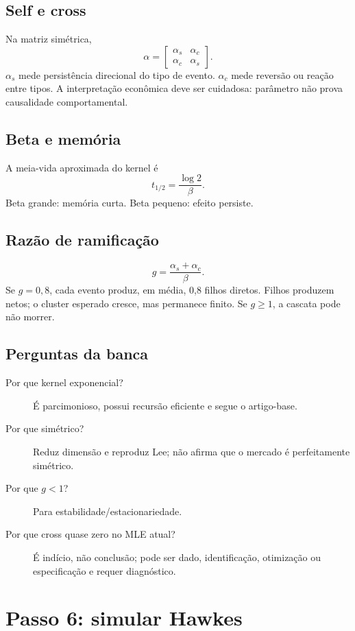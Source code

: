 \documentclass[12pt,a4paper,openany]{report}
\begin{document}
\section{Self e cross}

Na matriz simétrica,
\[
\alpha=
\begin{bmatrix}\alpha_s&\alpha_c\\\alpha_c&\alpha_s\end{bmatrix}.
\]
\(\alpha_s\) mede persistência direcional do tipo de evento. \(\alpha_c\) mede reversão
ou reação entre tipos. A interpretação econômica deve ser cuidadosa: parâmetro não
prova causalidade comportamental.

\section{Beta e memória}

A meia-vida aproximada do kernel é
\[
t_{1/2}=\frac{\log 2}{\beta}.
\]
Beta grande: memória curta. Beta pequeno: efeito persiste.

\section{Razão de ramificação}

\[
g=\frac{\alpha_s+\alpha_c}{\beta}.
\]
Se \(g=0,8\), cada evento produz, em média, 0,8 filhos diretos. Filhos produzem netos;
o cluster esperado cresce, mas permanece finito. Se \(g\ge1\), a cascata pode não morrer.

\section{Perguntas da banca}

\begin{description}
  \item[Por que kernel exponencial?] É parcimonioso, possui recursão eficiente e segue
  o artigo-base.
  \item[Por que simétrico?] Reduz dimensão e reproduz Lee; não afirma que o mercado é
  perfeitamente simétrico.
  \item[Por que \(g<1\)?] Para estabilidade/estacionariedade.
  \item[Por que cross quase zero no MLE atual?] É indício, não conclusão; pode ser dado,
  identificação, otimização ou especificação e requer diagnóstico.
\end{description}

\chapter{Passo 6: simular Hawkes}
\end{document}
